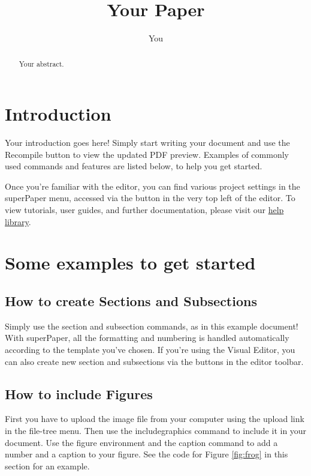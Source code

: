 \documentclass{article}
\title{Your Paper}
\author{You}
\begin{document}
\maketitle

\begin{abstract}
Your abstract.
\end{abstract}

\section{Introduction}

Your introduction goes here! Simply start writing your document and use the Recompile button to view the updated PDF preview. Examples of commonly used commands and features are listed below, to help you get started.

Once you're familiar with the editor, you can find various project settings in the superPaper menu, accessed via the button in the very top left of the editor. To view tutorials, user guides, and further documentation, please visit our \href{https://www.superpaper.com/learn}{help library}.

\section{Some examples to get started}

\subsection{How to create Sections and Subsections}

Simply use the section and subsection commands, as in this example document! With superPaper, all the formatting and numbering is handled automatically according to the template you've chosen. If you're using the Visual Editor, you can also create new section and subsections via the buttons in the editor toolbar.

\subsection{How to include Figures}

First you have to upload the image file from your computer using the upload link in the file-tree menu. Then use the includegraphics command to include it in your document. Use the figure environment and the caption command to add a number and a caption to your figure. See the code for Figure \ref{fig:frog} in this section for an example.
\end{document}
